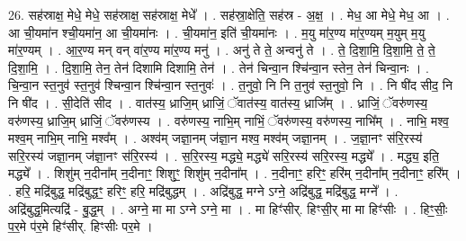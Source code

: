 \documentclass[17pt]{extarticle}
\begin{document}
26. सह॑स्राक्ष॒ मेधे॒ मेधे॒ सह॑स्राक्ष॒ सह॑स्राक्ष॒ मेधे᳚ । . सह॑स्रा॒क्षेति॒ सह॑स्र - अ॒क्ष॒ । . मेध॒ आ मेधे॒ मेध॒ आ । . आ ची॒यमा॑न श्ची॒यमा॑न॒ आ ची॒यमा॑नः । . ची॒यमा॑न॒ इति॑ ची॒यमा॑नः । . म॒यु मा॑र॒ण्य मा॑र॒ण्यम् म॒युम् म॒यु मा॑र॒ण्यम् । . आ॒र॒ण्य मन् वन् वा॑र॒ण्य मा॑र॒ण्य मनु॑ । . अनु॑ ते ते॒ अन्वनु॑ ते । . ते॒ दि॒शा॒मि॒ दि॒शा॒मि॒ ते॒ ते॒ दि॒शा॒मि॒ । . दि॒शा॒मि॒ तेन॒ तेन॑ दिशामि दिशामि॒ तेन॑ । . तेन॑ चिन्वा॒न श्चि॑न्वा॒न स्तेन॒ तेन॑ चिन्वा॒नः । . चि॒न्वा॒न स्त॒नुव॑ स्त॒नुव॑ श्चिन्वा॒न श्चि॑न्वा॒न स्त॒नुवः॑ । . त॒नुवो॒ नि नि त॒नुव॑ स्त॒नुवो॒ नि । . नि षी॑द सीद॒ नि नि षी॑द । . सी॒देति॑ सीद । . वात॑स्य॒ ध्राजि॒म् ध्राजिं॒ ॅवात॑स्य॒ वात॑स्य॒ ध्राजि᳚म् । . ध्राजिं॒ ॅवरु॑णस्य॒ वरु॑णस्य॒ ध्राजि॒म् ध्राजिं॒ ॅवरु॑णस्य । . वरु॑णस्य॒ नाभि॒म् नाभिं॒ ॅवरु॑णस्य॒ वरु॑णस्य॒ नाभि᳚म् । . नाभि॒ मश्व॒ मश्व॒म् नाभि॒म् नाभि॒ मश्व᳚म् । . अश्व॑म् जज्ञा॒नम् ज॑ज्ञा॒न मश्व॒ मश्व॑म् जज्ञा॒नम् । . ज॒ज्ञा॒नꣳ स॑रि॒रस्य॑ सरि॒रस्य॑ जज्ञा॒नम् ज॑ज्ञा॒नꣳ स॑रि॒रस्य॑ । . स॒रि॒रस्य॒ मद्ध्ये॒ मद्ध्ये॑ सरि॒रस्य॑ सरि॒रस्य॒ मद्ध्ये᳚ । . मद्ध्य॒ इति॒ मद्ध्ये᳚ । . शिशु॑म् न॒दीना᳚म् न॒दीनाꣳ॒॒ शिशुꣳ॒॒ शिशु॑म् न॒दीना᳚म् । . न॒दीनाꣳ॒॒ हरिꣳ॒॒ हरि॑म् न॒दीना᳚म् न॒दीनाꣳ॒॒ हरि᳚म् । . हरि॒ मद्रि॑बुद्ध॒ मद्रि॑बुद्धꣳ॒॒ हरिꣳ॒॒ हरि॒ मद्रि॑बुद्धम् । . अद्रि॑बुद्ध॒ मग्ने ऽग्ने॒ अद्रि॑बुद्ध॒ मद्रि॑बुद्ध॒ मग्ने᳚ । . अद्रि॑बुद्ध॒मित्यद्रि॑ - बु॒द्ध॒म् । . अग्ने॒ मा मा ऽग्ने ऽग्ने॒ मा । . मा हिꣳ॑सीर्. हिꣳसी॒र् मा मा हिꣳ॑सीः । . हिꣳ॒॒सीः॒ प॒र॒मे प॑र॒मे हिꣳ॑सीर्. हिꣳसीः पर॒मे । \newline
\end{document}
